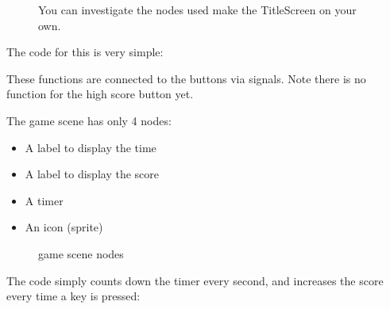 \documentclass[a4paper,12pt,english]{sphinxmanual}
\begin{document}
\begin{figure}[htbp]
\centering
\capstart

\noindent{}
\caption{You can investigate the nodes used make the TitleScreen on your own.}\label{\detokenize{tutorial:id2}}\end{figure}

\sphinxAtStartPar
The code for this is very simple:

\begin{sphinxVerbatim}[commandchars=\\\{\}]
 

 
\end{sphinxVerbatim}

\sphinxAtStartPar
These functions are connected to the buttons via signals. Note there is
no function for the high score button yet.

\sphinxAtStartPar
The game scene has only 4 nodes:
\begin{itemize}
\item {} 
\sphinxAtStartPar
A label to display the time

\item {} 
\sphinxAtStartPar
A label to display the score

\item {} 
\sphinxAtStartPar
A timer

\item {} 
\sphinxAtStartPar
An icon (sprite)

\end{itemize}

\begin{figure}[htbp]
\centering
\capstart

\noindent{}
\caption{game scene nodes}\label{\detokenize{tutorial:id3}}\end{figure}

\sphinxAtStartPar
The code simply counts down the timer every second, and increases the
score every time a key is pressed:
\end{document}
